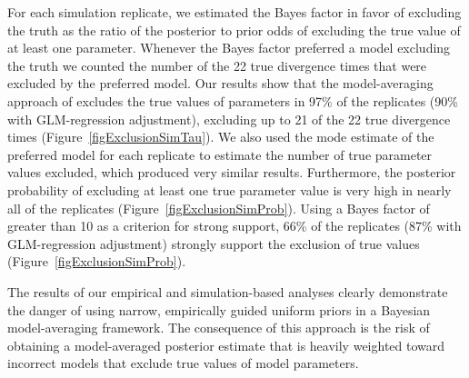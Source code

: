 \documentclass[letterpaper,12pt]{article}
\begin{document}
\begin{linenumbers}
For each simulation replicate, we estimated the Bayes factor in favor
of excluding the truth as the ratio of the posterior to prior odds of
excluding the true value of at least one parameter.
Whenever the Bayes factor preferred a model excluding the truth we counted the
number of the 22 true divergence times that were excluded by the preferred
model.
Our results show that the model-averaging approach of \citet{Hickerson2013}
excludes the true values of parameters in 97\% of the replicates (90\% with
GLM-regression adjustment), excluding up to 21 of the 22 true divergence times
(Figure~\ref{figExclusionSimTau}).
We also used the mode estimate of the preferred model for each replicate to
estimate the number of true parameter values excluded, which produced very
similar results.
Furthermore, the posterior probability of excluding at least one true parameter
value is very high in nearly all of the replicates
(Figure~\ref{figExclusionSimProb}).
Using a Bayes factor of greater than 10 as a criterion for strong support, 66\%
of the replicates (87\% with GLM-regression adjustment) strongly support the
exclusion of true values (Figure~\ref{figExclusionSimProb}).

The results of our empirical and simulation-based analyses clearly demonstrate
the danger of using narrow, empirically guided uniform priors in a Bayesian
model-averaging framework.
The consequence of this approach is the risk of obtaining a model-averaged
posterior estimate that is heavily weighted toward incorrect models that
exclude true values of model parameters.



\end{linenumbers}
\end{document}

